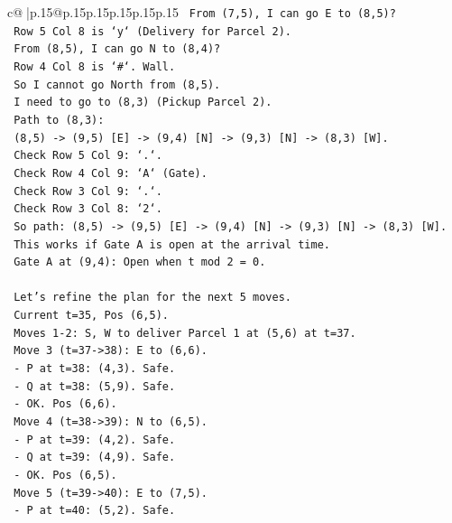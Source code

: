 \documentclass{article}
\begin{document}
{\begin{supertabular}{c@{$\;$}|p{.15\linewidth}@{}p{.15\linewidth}p{.15\linewidth}p{.15\linewidth}p{.15\linewidth}p{.15\linewidth}}
{{{\texttt{    From (7,5), I can go E to (8,5)?} \\
\texttt{      Row 5 Col 8 is `y` (Delivery for Parcel 2).} \\
\texttt{    From (8,5), I can go N to (8,4)?} \\
\texttt{      Row 4 Col 8 is `\#`. Wall.} \\
\texttt{    So I cannot go North from (8,5).} \\
\texttt{    I need to go to (8,3) (Pickup Parcel 2).} \\
\texttt{    Path to (8,3):} \\
\texttt{    (8,5) {-}> (9,5) {[}E{]} {-}> (9,4) {[}N{]} {-}> (9,3) {[}N{]} {-}> (8,3) {[}W{]}.} \\
\texttt{    Check Row 5 Col 9: `.`.} \\
\texttt{    Check Row 4 Col 9: `A` (Gate).} \\
\texttt{    Check Row 3 Col 9: `.`.} \\
\texttt{    Check Row 3 Col 8: `2`.} \\
\texttt{    So path: (8,5) {-}> (9,5) {[}E{]} {-}> (9,4) {[}N{]} {-}> (9,3) {[}N{]} {-}> (8,3) {[}W{]}.} \\
\texttt{    This works if Gate A is open at the arrival time.} \\
\texttt{    Gate A at (9,4): Open when t mod 2 = 0.} \\
\\ 
\texttt{    Let's refine the plan for the next 5 moves.} \\
\texttt{    Current t=35, Pos (6,5).} \\
\texttt{    Moves 1{-}2: S, W to deliver Parcel 1 at (5,6) at t=37.} \\
\texttt{    Move 3 (t=37{-}>38): E to (6,6).} \\
\texttt{      {-} P at t=38: (4,3). Safe.} \\
\texttt{      {-} Q at t=38: (5,9). Safe.} \\
\texttt{      {-} OK. Pos (6,6).} \\
\texttt{    Move 4 (t=38{-}>39): N to (6,5).} \\
\texttt{      {-} P at t=39: (4,2). Safe.} \\
\texttt{      {-} Q at t=39: (4,9). Safe.} \\
\texttt{      {-} OK. Pos (6,5).} \\
\texttt{    Move 5 (t=39{-}>40): E to (7,5).} \\
\texttt{      {-} P at t=40: (5,2). Safe.} \\
}}}
\end{supertabular}}
\end{document}
